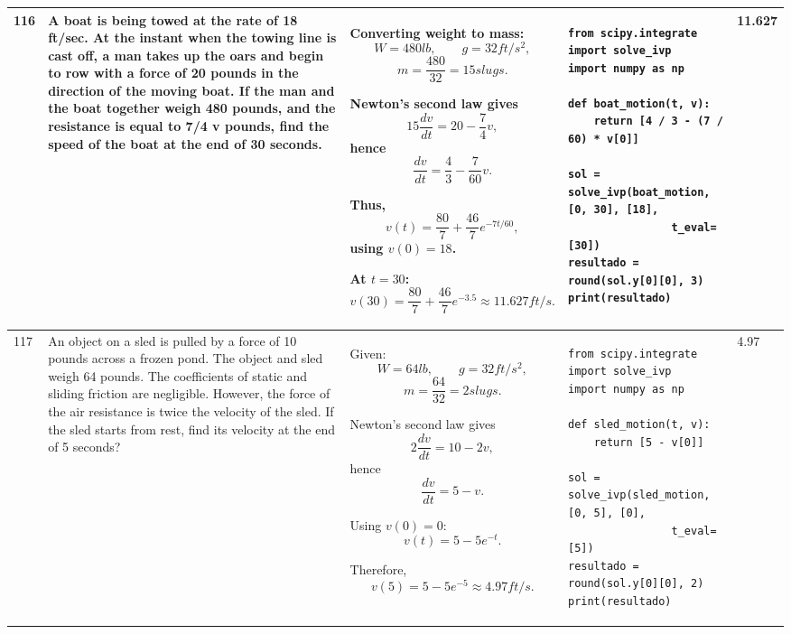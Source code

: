 \documentclass[a4paper,12pt]{article}
\begin{document}
\begin{longtable}{|p{0.3cm}|p{}|p{10cm}|p{}|p{1.5cm}|}
116 & A boat is being towed at the rate of 18 ft/sec. At the instant when the towing line is cast off, a man takes up the oars and begin to row with a force of 20 pounds in the direction of the moving boat. If the man and the boat together weigh 480 pounds, and the resistance is equal to 7/4 v pounds, find the speed of the boat at the end of 30 seconds. &
Converting weight to mass:
\[
W=480lb,\qquad g=32ft/s^2,
\]
\[
m=\frac{480}{32}=15slugs.
\]

Newton's second law gives
\[
15\frac{dv}{dt}=20-\frac74v,
\]
hence
\[
\frac{dv}{dt}=\frac43-\frac7{60}v.
\]

Thus,
\[
v(t)=\frac{80}{7}+\frac{46}{7}e^{-7t/60},
\]
using \(v(0)=18\).

At \(t=30\):
\[
v(30)=\frac{80}{7}+\frac{46}{7}e^{-3.5}
\approx11.627ft/s.
\] &
\begin{verbatim}
from scipy.integrate import solve_ivp
import numpy as np

def boat_motion(t, v):
    return [4 / 3 - (7 / 60) * v[0]]

sol = solve_ivp(boat_motion, [0, 30], [18],
                t_eval=[30])
resultado = round(sol.y[0][0], 3)
print(resultado)
\end{verbatim}
& 11.627 \\ \hline

117 & An object on a sled is pulled by a force of 10 pounds across a frozen pond. The object and sled weigh 64 pounds. The coefficients of static and sliding friction are negligible. However, the force of the air resistance is twice the velocity of the sled. If the sled starts from rest, find its velocity at the end of 5 seconds? &
Given:
\[
W=64lb,\qquad g=32ft/s^2,
\]
\[
m=\frac{64}{32}=2slugs.
\]

Newton's second law gives
\[
2\frac{dv}{dt}=10-2v,
\]
hence
\[
\frac{dv}{dt}=5-v.
\]

Using \(v(0)=0\):
\[
v(t)=5-5e^{-t}.
\]

Therefore,
\[
v(5)=5-5e^{-5}
\approx4.97ft/s.
\] &
\begin{verbatim}
from scipy.integrate import solve_ivp
import numpy as np

def sled_motion(t, v):
    return [5 - v[0]]

sol = solve_ivp(sled_motion, [0, 5], [0],
                t_eval=[5])
resultado = round(sol.y[0][0], 2)
print(resultado)
\end{verbatim}
& 4.97 \\ \hline


\end{longtable}
\end{document}
